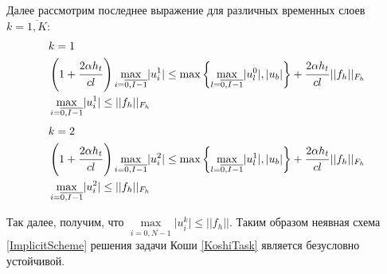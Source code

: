 \documentclass[a4paper,12pt,russian, fleqn]{extreport}
\begin{document}
	Далее рассмотрим последнее выражение для различных временных слоев $k = \overline{1,K}$:
	\begin{align}
		& k =  1 \nonumber \\
		& \left( 1 + \dfrac{\strut 2\alpha h_t}{\strut cl} \right) \max\limits_{i=\overline{0,I-1}} \lvert u_i^1 \rvert \leq  \max\left\{\max\limits_{l = \overline{0, I-1}}\lvert u_l^{0} \rvert, \lvert u_b \rvert \right\} + \dfrac{\strut 2\alpha h_t}{\strut cl} \lvert\lvert f_h \rvert\rvert_{F_h} \nonumber \\
		& \max_{i=\overline{0, I-1}} \lvert u_i^1 \rvert \leq \lvert\lvert f_h \rvert\rvert_{F_h} \nonumber
	\end{align}
	\begin{align}
		& k =  2 \nonumber \\
		& \left( 1 + \dfrac{\strut 2\alpha h_t}{\strut cl} \right) \max\limits_{i=\overline{0,I-1}} \lvert u_i^2 \rvert \leq  \max\left\{\max\limits_{l = \overline{0, I-1}}\lvert u_l^{1} \rvert, \lvert u_b \rvert \right\} + \dfrac{\strut 2\alpha h_t}{\strut cl} \lvert\lvert f_h \rvert\rvert_{F_h} \nonumber \\
		& \max_{i=\overline{0, I-1}} \lvert u_i^2 \rvert \leq \lvert\lvert f_h \rvert\rvert_{F_h} \nonumber
	\end{align}
	
	Так далее, получим, что $\max\limits_{i=\overline{0,N-1}}\lvert u_i^k \rvert \leq \lvert \lvert f_h \rvert\rvert$. Таким образом неявная схема \eqref{ImplicitScheme} решения задачи Коши \eqref{KoshiTask} является безусловно устойчивой.
	
\end{document}
